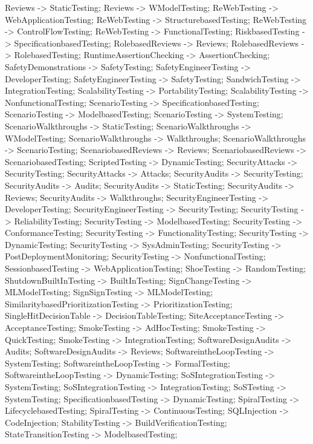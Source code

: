 \documentclass{article}
\begin{document}
{Reviews -> StaticTesting;
Reviews -> WModelTesting;
ReWebTesting -> WebApplicationTesting;
ReWebTesting -> StructurebasedTesting;
ReWebTesting -> ControlFlowTesting;
ReWebTesting -> FunctionalTesting;
RiskbasedTesting -> SpecificationbasedTesting;
RolebasedReviews -> Reviews;
RolebasedReviews -> RolebasedTesting;
RuntimeAssertionChecking -> AssertionChecking;
SafetyDemonstrations -> SafetyTesting;
SafetyEngineerTesting -> DeveloperTesting;
SafetyEngineerTesting -> SafetyTesting;
SandwichTesting -> IntegrationTesting;
ScalabilityTesting -> PortabilityTesting;
ScalabilityTesting -> NonfunctionalTesting;
ScenarioTesting -> SpecificationbasedTesting;
ScenarioTesting -> ModelbasedTesting;
ScenarioTesting -> SystemTesting;
ScenarioWalkthroughs -> StaticTesting;
ScenarioWalkthroughs -> WModelTesting;
ScenarioWalkthroughs -> Walkthroughs;
ScenarioWalkthroughs -> ScenarioTesting;
ScenariobasedReviews -> Reviews;
ScenariobasedReviews -> ScenariobasedTesting;
ScriptedTesting -> DynamicTesting;
SecurityAttacks -> SecurityTesting;
SecurityAttacks -> Attacks;
SecurityAudits -> SecurityTesting;
SecurityAudits -> Audits;
SecurityAudits -> StaticTesting;
SecurityAudits -> Reviews;
SecurityAudits -> Walkthroughs;
SecurityEngineerTesting -> DeveloperTesting;
SecurityEngineerTesting -> SecurityTesting;
SecurityTesting -> ReliabilityTesting;
SecurityTesting -> ModelbasedTesting;
SecurityTesting -> ConformanceTesting;
SecurityTesting -> FunctionalityTesting;
SecurityTesting -> DynamicTesting;
SecurityTesting -> SysAdminTesting;
SecurityTesting -> PostDeploymentMonitoring;
SecurityTesting -> NonfunctionalTesting;
SessionbasedTesting -> WebApplicationTesting;
ShoeTesting -> RandomTesting;
ShutdownBuiltInTesting -> BuiltInTesting;
SignChangeTesting -> MLModelTesting;
SignSignTesting -> MLModelTesting;
SimilaritybasedPrioritizationTesting -> PrioritizationTesting;
SingleHitDecisionTable -> DecisionTableTesting;
SiteAcceptanceTesting -> AcceptanceTesting;
SmokeTesting -> AdHocTesting;
SmokeTesting -> QuickTesting;
SmokeTesting -> IntegrationTesting;
SoftwareDesignAudits -> Audits;
SoftwareDesignAudits -> Reviews;
SoftwareintheLoopTesting -> SystemTesting;
SoftwareintheLoopTesting -> FormalTesting;
SoftwareintheLoopTesting -> DynamicTesting;
SoSIntegrationTesting -> SystemTesting;
SoSIntegrationTesting -> IntegrationTesting;
SoSTesting -> SystemTesting;
SpecificationbasedTesting -> DynamicTesting;
SpiralTesting -> LifecyclebasedTesting;
SpiralTesting -> ContinuousTesting;
SQLInjection -> CodeInjection;
StabilityTesting -> BuildVerificationTesting;
StateTransitionTesting -> ModelbasedTesting;
}
\end{document}
